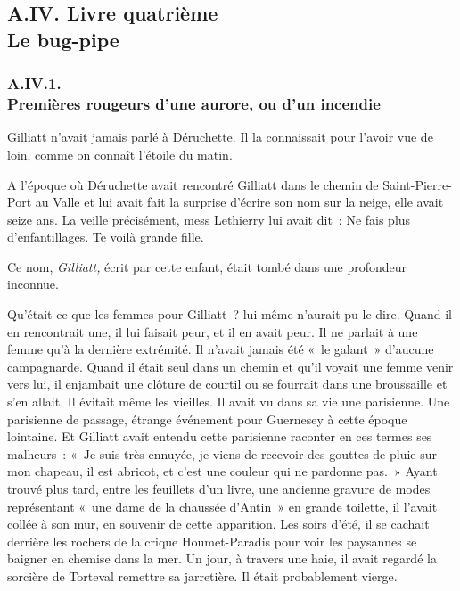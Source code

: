 \documentclass[french,twoside]{book} %
\begin{document}
 \subsection[{A.IV. Livre quatrième. Le bug-pipe}]{A.IV. Livre quatrième \\
Le bug-pipe}
  \subsubsection[{A.IV.1. Premières rougeurs d’une aurore, ou d’un incendie}]{A.IV.1. \\
Premières rougeurs d’une aurore, ou d’un incendie}
\noindent Gilliatt n’avait jamais parlé à Déruchette. Il la connaissait pour l’avoir vue de loin, comme on connaît l’étoile du matin.\par
A l’époque où Déruchette avait rencontré Gilliatt dans le chemin de Saint-Pierre-Port au Valle et lui avait fait la surprise d’écrire son nom sur la neige, elle avait seize ans. La veille précisément, mess Lethierry lui avait dit : Ne fais plus d’enfantillages. Te voilà grande fille.\par
Ce nom, \emph{Gilliatt,} écrit par cette enfant, était tombé dans une profondeur inconnue.\par
Qu’était-ce que les femmes pour Gilliatt ? lui-même n’aurait pu le dire. Quand il en rencontrait une, il lui faisait peur, et il en avait peur. Il ne parlait à une femme qu’à la dernière extrémité. Il n’avait jamais été « le galant » d’aucune campagnarde. Quand il était seul  dans un chemin et qu’il voyait une femme venir vers lui, il enjambait une clôture de courtil ou se fourrait dans une broussaille et s’en allait. Il évitait même les vieilles. Il avait vu dans sa vie une parisienne. Une parisienne de passage, étrange événement pour Guernesey à cette époque lointaine. Et Gilliatt avait entendu cette parisienne raconter en ces termes ses malheurs : « Je suis très ennuyée, je viens de recevoir des gouttes de pluie sur mon chapeau, il est abricot, et c’est une couleur qui ne pardonne pas. » Ayant trouvé plus tard, entre les feuillets d’un livre, une ancienne gravure de modes représentant « une dame de la chaussée d’Antin » en grande toilette, il l’avait collée à son mur, en souvenir de cette apparition. Les soirs d’été, il se cachait derrière les rochers de la crique Houmet-Paradis pour voir les paysannes se baigner en chemise dans la mer. Un jour, à travers une haie, il avait regardé la sorcière de Torteval remettre sa jarretière. Il était probablement vierge.\par
\end{document}
